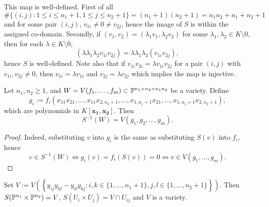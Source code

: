         \begin{remark}
            This map is well-defined. First of all $\#\{(i,j):1\leq i\leq n_1+1, 1\leq j\leq n_2+1\} = (n_1+1)(n_2+1)= n_1n_2+n_1+n_2+1$ and for some pair $(i,j)$, $v_{1i}\neq0 \neq v_{2j}$, hence the image of $S$ is within the assigned co-domain. Secondly, if $(v_1,v_2)=(\lambda_1v_1,\lambda_2v_2)$ for some $\lambda_1,\lambda_2\in K\setminus 0$, then for each $\lambda \in K\setminus 0$, 
            $$(\lambda \lambda_1\lambda_2 v_{1i}v_{2j})= \lambda\lambda_1\lambda_2 (v_{1i}v_{2j}),$$
            hence $S$ is well-defined.
            Note also that if $v_{1i}v_{2i}=\lambda v_{1i}v_{2j}$ for a pair $(i,j)$ with $v_{1i},v_{2j}\neq 0$, then $v_{1i} = \lambda v_{1i}$ and $v_{2j} = \lambda v_{2j}$ which implies the map is injective.   
        \end{remark}
        \begin{lemma}\label{SegreEmbeddingIsContinuous}
            Let $n_1,n_2\geq 1$, and $W=V(f_1,\dots,f_m)\subset \mathbb{P}^{n_1+n_2+n_1n_2}$ be a variety. Define $$g_i := f_i(x_{11}x_{21},\dots,x_{11}x_{2,n_2+1},\dots, x_{1,n_1+1}x_{21},\dots,x_{1,n_1+1}x_{2,n_2+1}),$$
            which are polynomials in $K[\mathbf{x_1},\mathbf{x_2}]$. Then $$S^{-1}(W)= V(g_1,g_2,\dots,g_m).$$ 
        \end{lemma}
        \begin{proof}
            Indeed, substituting $v$ into $g_i$ is the same as substituting $S(v)$ into $f_i$, hence 
            $$v\in S^{-1}(W) \iff  g_i(v) = f_i(S(v))= 0 \iff v\in V(g_1,\dots,g_m).$$
        \end{proof}
        \begin{lemma}\label{SegreEmbeddingHasImageWhichIsVariety}
            Set $V:=V(\left\{y_{ij}y_{kl} - y_{il}y_{kj} : i,k\in\{1,\dots, n_1+1\}, j,l\in \{1,\dots,n_2+1\}\right\})$. Then $S(\mathbb{P}^{n_1}\times \mathbb{P}^{n_2}) = V$, $S(U_i\times U_j)= V\cap U_{ij}$ and $V$ is a variety.  
        \end{lemma}
